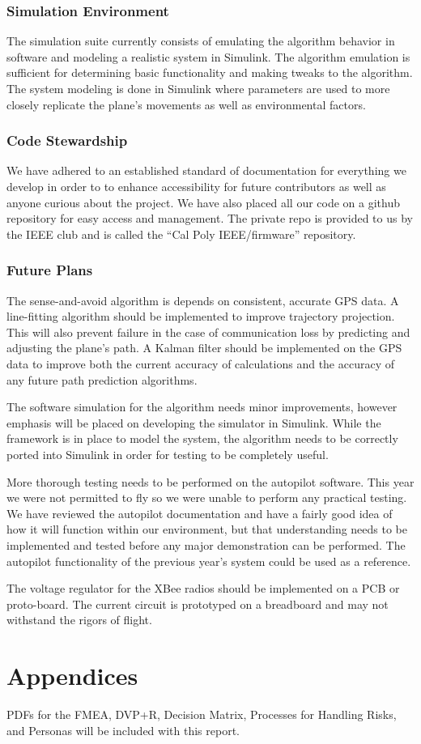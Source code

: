 \documentclass[12pt]{article}
\begin{document}
\subsubsection{Simulation Environment}
The simulation suite currently consists of emulating the algorithm behavior in software and modeling a realistic system in Simulink. The algorithm emulation is sufficient for determining basic functionality and making tweaks to the algorithm. The system modeling is done in Simulink where parameters are used to more closely replicate the plane's movements as well as environmental factors.

\subsubsection{Code Stewardship}
We have adhered to an established standard of documentation for everything we develop in order to to enhance accessibility for future contributors as well as anyone curious about the project.  We have also placed all our code on a github repository for easy access and management. The private repo is provided to us by the IEEE club and is called the “Cal Poly IEEE/firmware” repository.

\subsubsection{Future Plans}
The sense-and-avoid algorithm is depends on consistent, accurate GPS data. A line-fitting algorithm should be implemented to improve trajectory projection. This will also prevent failure in the case of communication loss by predicting and adjusting the plane's path. A Kalman filter should be implemented on the GPS data to improve both the current accuracy of calculations and the accuracy of any future path prediction algorithms.

The software simulation for the algorithm needs minor improvements, however emphasis will be placed on developing the simulator in Simulink. While the framework is in place to model the system, the algorithm needs to be correctly ported into Simulink in order for testing to be completely useful.

More thorough testing needs to be performed on the autopilot software. This year we were not permitted to fly so we were unable to perform any practical testing. We have reviewed the autopilot documentation and have a fairly good idea of how it will function within our environment, but that understanding needs to be implemented and tested before any major demonstration can be performed. The autopilot functionality of the previous year's system could be used as a reference.

The voltage regulator for the XBee radios should be implemented on a PCB or proto-board. The current circuit is prototyped on a breadboard and may not withstand the rigors of flight.

\section{Appendices}
PDFs for the FMEA, DVP+R, Decision Matrix, Processes for Handling Risks, and Personas will be included with this report.
\end{document}
